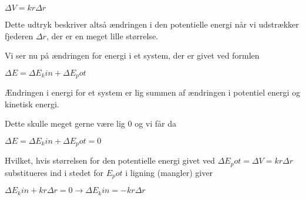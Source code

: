 \documentclass[12pt,a4paper]{article}
\theoremstyle{break}
\theoremstyle{nonumberplain}
\begin{document}
\begin{center}
$\Delta V = kr \Delta r$
\end{center} 

Dette udtryk beskriver altså ændringen i den potentielle energi når vi udstrækker fjederen $\Delta r$, der er en meget lille størrelse. 

Vi ser nu på ændringen for energi i et system, der er givet ved formlen 
\begin{center}
$\Delta E = \Delta E_kin + \Delta E_pot$
\end{center}

Ændringen i energi for et system er lig summen af ændringen i potentiel energi og kinetisk energi. 

Dette skulle meget gerne være lig 0 og vi får da 

\begin{center}
$\Delta E = \Delta E_kin + \Delta E_pot = 0$
\end{center}

Hvilket, hvis størrelsen for den potentielle energi givet ved $\Delta E_pot = \Delta V = kr \Delta r$ substitueres ind i stedet for $E_pot$ i ligning (mangler) giver

\begin{center}
$\Delta E_kin + kr \Delta r = 0 \rightarrow \Delta E_kin = -kr \Delta r$
\end{center}
\end{document}
